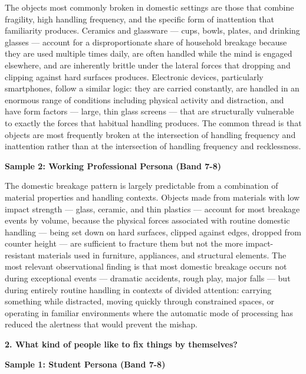 The objects most commonly broken in domestic settings are those that combine fragility, high handling frequency, and the specific form of inattention that familiarity produces. Ceramics and glassware — cups, bowls, plates, and drinking glasses — account for a disproportionate share of household breakage because they are used multiple times daily, are often handled while the mind is engaged elsewhere, and are inherently brittle under the lateral forces that dropping and clipping against hard surfaces produces. Electronic devices, particularly smartphones, follow a similar logic: they are carried constantly, are handled in an enormous range of conditions including physical activity and distraction, and have form factors — large, thin glass screens — that are structurally vulnerable to exactly the forces that habitual handling produces. The common thread is that objects are most frequently broken at the intersection of handling frequency and inattention rather than at the intersection of handling frequency and recklessness.

\textbf{Sample 2: Working Professional Persona (Band 7-8)}

The domestic breakage pattern is largely predictable from a combination of material properties and handling contexts. Objects made from materials with low impact strength — glass, ceramic, and thin plastics — account for most breakage events by volume, because the physical forces associated with routine domestic handling — being set down on hard surfaces, clipped against edges, dropped from counter height — are sufficient to fracture them but not the more impact-resistant materials used in furniture, appliances, and structural elements. The most relevant observational finding is that most domestic breakage occurs not during exceptional events — dramatic accidents, rough play, major falls — but during entirely routine handling in contexts of divided attention: carrying something while distracted, moving quickly through constrained spaces, or operating in familiar environments where the automatic mode of processing has reduced the alertness that would prevent the mishap.

\separator

\begin{ieltsquestion}
\textbf{2. What kind of people like to fix things by themselves?}
\end{ieltsquestion}
\textbf{Sample 1: Student Persona (Band 7-8)}

